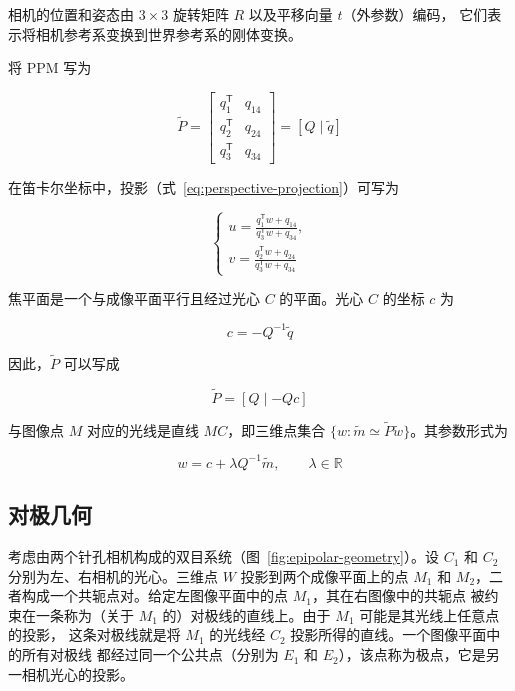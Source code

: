 相机的位置和姿态由 $3\times3$ 旋转矩阵 $R$ 以及平移向量 $t$（外参数）编码，
它们表示将相机参考系变换到世界参考系的刚体变换。

将 PPM 写为

\begin{equation}
  \widetilde{P}=
  \begin{bmatrix}
    q_1^{\mathsf T} & q_{14}\\
    q_2^{\mathsf T} & q_{24}\\
    q_3^{\mathsf T} & q_{34}
  \end{bmatrix}
  =[Q\mid\tilde{q}]
  \label{eq:ppm-block-form}
\end{equation}

在笛卡尔坐标中，投影（式~\eqref{eq:perspective-projection}）可写为

\begin{equation}
  \begin{cases}
    \displaystyle u=\frac{q_1^{\mathsf T}w+q_{14}}{q_3^{\mathsf T}w+q_{34}},\\[1.2ex]
    \displaystyle v=\frac{q_2^{\mathsf T}w+q_{24}}{q_3^{\mathsf T}w+q_{34}}
  \end{cases}
  \label{eq:cartesian-projection}
\end{equation}

焦平面是一个与成像平面平行且经过光心 $C$ 的平面。光心 $C$ 的坐标 $c$ 为

\begin{equation}
  c=-Q^{-1}\tilde{q}
  \label{eq:camera-center}
\end{equation}

因此，$\widetilde{P}$ 可以写成

\begin{equation}
  \widetilde{P}=[Q\mid-Qc]
  \label{eq:ppm-camera-center}
\end{equation}

与图像点 $M$ 对应的光线是直线 $MC$，即三维点集合
$\{w:\tilde{m}\simeq\widetilde{P}\tilde{w}\}$。其参数形式为

\begin{equation}
  w=c+\lambda Q^{-1}\tilde{m},\qquad \lambda\in\mathbb{R}
  \label{eq:optical-ray}
\end{equation}

\subsection{对极几何}
\label{sec:epipolar-geometry}

考虑由两个针孔相机构成的双目系统（图~\ref{fig:epipolar-geometry}）。设 $C_1$ 和
$C_2$ 分别为左、右相机的光心。三维点 $W$ 投影到两个成像平面上的点 $M_1$ 和
$M_2$，二者构成一个共轭点对。给定左图像平面中的点 $M_1$，其在右图像中的共轭点
被约束在一条称为（关于 $M_1$ 的）对极线的直线上。由于 $M_1$ 可能是其光线上任意点的投影，
这条对极线就是将 $M_1$ 的光线经 $C_2$ 投影所得的直线。一个图像平面中的所有对极线
都经过同一个公共点（分别为 $E_1$ 和 $E_2$），该点称为极点，它是另一相机光心的投影。

